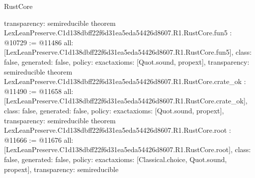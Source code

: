 \begin{lexlean}{RustCore}
\begin{coremodule}
{  transparency: semireducible
}
theorem LexLeanPreserve.C1d138dbff22f6d31ea5eda54426d8607.R1.RustCore.fun5 : @10729 := @11486 {
  all: [LexLeanPreserve.C1d138dbff22f6d31ea5eda54426d8607.R1.RustCore.fun5],
  class: false,
  generated: false,
  policy: exact{axioms: [Quot.sound, propext]},
  transparency: semireducible
}
theorem LexLeanPreserve.C1d138dbff22f6d31ea5eda54426d8607.R1.RustCore.crate_ok : @11490 := @11658 {
  all: [LexLeanPreserve.C1d138dbff22f6d31ea5eda54426d8607.R1.RustCore.crate_ok],
  class: false,
  generated: false,
  policy: exact{axioms: [Quot.sound, propext]},
  transparency: semireducible
}
theorem LexLeanPreserve.C1d138dbff22f6d31ea5eda54426d8607.R1.RustCore.root : @11666 := @11676 {
  all: [LexLeanPreserve.C1d138dbff22f6d31ea5eda54426d8607.R1.RustCore.root],
  class: false,
  generated: false,
  policy: exact{axioms: [Classical.choice, Quot.sound, propext]},
  transparency: semireducible
}


\end{coremodule}
\end{lexlean}
